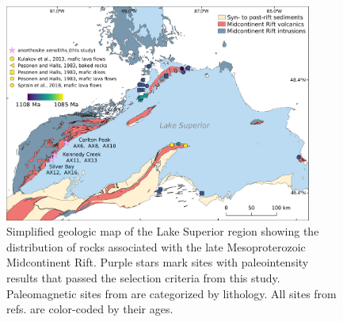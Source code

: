 \begin{figure}[h!]
\centering
\noindent\includegraphics[width=0.9\textwidth]{figure/Zhang2022/Geologic_map.pdf}
\caption[Simplified geologic map of the Lake Superior region]{\footnotesize{Simplified geologic map of the Lake Superior region showing the distribution of rocks associated with the late Mesoproterozoic Midcontinent Rift. Purple stars mark sites with paleointensity results that passed the selection criteria from this study. Paleomagnetic sites from \citealp{Pesonen1983a} are categorized by lithology. All sites from refs. \citealp{Pesonen1983a, Kulakov2013a, Sprain2018a} are color-coded by their ages.}}
\label{fig:Chap_PINT_Geologic_map}
\end{figure}


